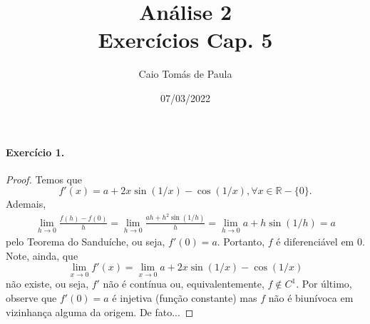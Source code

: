 \documentclass[12pt,a4paper]{article}
\title{\textbf{Análise 2}\\ Exercícios Cap. 5}
\author{Caio Tomás de Paula}
\date{07/03/2022}
\newcommand{\R}{\mathbb{R}}
\begin{document}
\maketitle

\paragraph{Exercício 1.}
    \begin{proof}
        Temos que
        \begin{equation*}
            f'(x) = a + 2x\sin(1/x) - \cos(1/x), \forall x\in\R - \{0\}.
        \end{equation*}
        Ademais,
        \begin{align*}
            \lim_{h\to 0} \frac{f(h) - f(0)}{h} 
            = \lim_{h\to 0} \frac{ah + h^2\sin(1/h)}{h}
            = \lim_{h\to 0} a + h\sin(1/h)
            = a
        \end{align*}
        pelo Teorema do Sanduíche, ou seja, $f'(0) = a$. Portanto, $f$ é
        diferenciável em $0$. Note, ainda, que
        \begin{equation*}
            \lim_{x\to 0} f'(x) = \lim_{x\to 0} a + 2x\sin(1/x) - \cos(1/x)
        \end{equation*}
        não existe, ou seja, $f'$ não é contínua ou, equivalentemente, $f\notin C^1$.
        Por último, observe que $f'(0) = a$ é injetiva (função constante) mas
        $f$ não é biunívoca em vizinhança alguma da origem. De fato...
    \end{proof}
\end{document}
